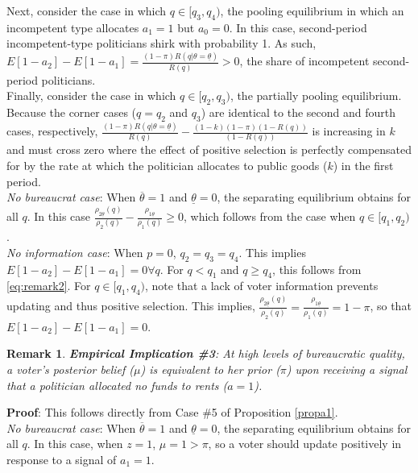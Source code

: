 \documentclass[11pt,english]{article}
\newtheorem{remark}{Remark}
\begin{document}
Next, consider the case in which $q \in [q_3, q_4)$, the pooling equilibrium in which an incompetent type allocates $a_1 = 1$ but $a_0 =0$. In this case, second-period incompetent-type politicians shirk with probability 1. As such, $E[1-a_2]-E[1-a_1] = \frac{(1-\pi)R(q|\theta= \underline{\theta})}{R(q)}>0$, the share of incompetent second-period politicians. \\

Finally, consider the case in which $q \in [q_2,q_3)$, the partially pooling equilibrium. Because the corner cases ($q=q_2$ and $q_3$) are identical to the second and fourth cases, respectively, $ \frac{(1-\pi)R(q|\theta= \underline{\theta})}{R(q)}- \frac{(1-k)(1-\pi)(1-R(q))}{(1-R(q))}$ is increasing in $k$ and must cross zero where the effect of positive selection is perfectly compensated for by the rate at which the politician allocates to public goods ($k$) in the first period. \\

\emph{No bureaucrat case}: When $\overline{\theta} = 1$ and $\underline{\theta} = 0$, the separating equilibrium obtains for all $q$. In this case $\frac{\rho_{2\underline{\theta}}(q)}{\rho_2(q)} - \frac{\rho_{1\underline{\theta}}}{\rho_1(q)} \geq 0$, which follows from the case when $q\in[q_1, q_2)$.\\

\emph{No information case}: When $p=0$, $q_2=q_3=q_4$. This implies $E[1-a_2]-E[1-a_1]=0 \forall q$. For $q < q_1$ and $q \geq q_4$, this follows from \eqref{eq:remark2}. For $q \in [q_1, q_4)$, note that a lack of voter information prevents updating and thus positive selection. This implies, $\frac{\rho_{2\underline{\theta}}(q)}{\rho_2(q)} = \frac{\rho_{1\underline{\theta}}}{\rho_1(q)} = 1-\pi$, so that $E[1-a_2]-E[1-a_1]=0$. 


\begin{remark}
\textbf{Empirical Implication \#3}: At high levels of bureaucratic quality, a voter's posterior belief ($\mu$) is equivalent to her prior ($\pi$) upon receiving a signal that a politician allocated no funds to rents ($a=1$).
\end{remark}

\textbf{Proof}: This follows directly from Case \#5 of Proposition \ref{propa1}. \\

\emph{No bureaucrat case}:  When $\overline{\theta} = 1$ and $\underline{\theta} = 0$, the separating equilibrium obtains for all $q$. In this case, when $z = 1$, $\mu = 1 > \pi$, so a voter should update positively in response to a signal of $a_1 = 1$. 
\end{document}
